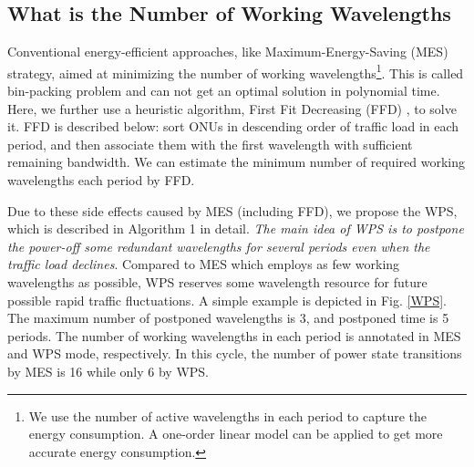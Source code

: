 \documentclass[letter]{IEEEtran}
\begin{document}
\subsection{What is the Number of Working Wavelengths}
Conventional energy-efficient approaches, like Maximum-Energy-Saving (MES) strategy, aimed at minimizing the number of working wavelengths\footnote{We use the number of active wavelengths in each period to capture the energy consumption. A one-order linear model can be applied to get more accurate energy consumption.}. This is called bin-packing problem and can not get an optimal solution in polynomial time. Here, we further use a heuristic algorithm, First Fit Decreasing (FFD) \cite{baker1985new}, to solve it. FFD is described below: sort ONUs in descending order of traffic load in each period, and then associate them with the first wavelength with sufficient remaining bandwidth. We can estimate the minimum number of required working wavelengths each period by FFD.

Due to these side effects caused by MES (including FFD), we propose the WPS, which is described in Algorithm 1 in detail. \emph{The main idea of WPS is to postpone the power-off some redundant wavelengths for several periods even when the traffic load declines}. Compared to MES which employs as few working wavelengths as possible, WPS reserves some wavelength resource for future possible rapid traffic fluctuations. A simple example is depicted in Fig. \ref{WPS}. The maximum number of postponed wavelengths is 3, and postponed time is 5 periods. The number of working wavelengths in each period is annotated in MES and WPS mode, respectively. In this cycle, the number of power state transitions by MES is 16 while only 6 by WPS. 
\end{document}
